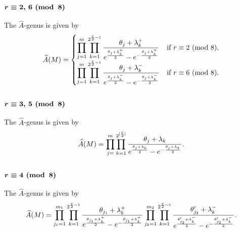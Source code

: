 \documentclass[pdftex]{sigma}
\newcommand{\A}{\mbox{$\widehat A$}}
\numberwithin{equation}{section}
\begin{document}
\subsubsection[$r\equiv 2,\,6 \,\,{\rm (mod\,\,\,8)}$]{$\boldsymbol{r\equiv 2,\,6 \,\,{\rm (mod\,\,\,8)}}$}

The \A-genus is given by
\begin{gather*}
\A(M)
= \begin{cases}
\displaystyle \prod _{j=1}^{m}\prod_{k=1}^{2^{{r\over 2}-1}}{\theta_j + \lambda_k^+\over e^{\theta_j + \lambda_k^+\over 2}
-e^{-{\theta_j + \lambda_k^+\over 2}}} & \mbox{if $r\equiv 2$ (mod 8)},\\
\displaystyle \prod_{j=1}^{m}\prod_{k=1}^{2^{{r\over 2}-1}}{\theta_j + \lambda_k^-\over e^{\theta_j + \lambda_k^-\over 2}
-e^{-{\theta_j + \lambda_k^-\over 2}}} & \mbox{if $r\equiv 6$ (mod 8)}.
\end{cases}
\end{gather*}

\subsubsection[$r\equiv3,\,5 \,\,{\rm (mod\,\,\,8)}$]{$\boldsymbol{r\equiv3,\,5 \,\,{\rm (mod\,\,\,8)}}$}

The \A-genus is given by
\begin{gather*}
\A(M) =\prod_{j=}^{m}\prod_{k=1}^{2^{[{r\over 2}]}}{\theta_j + \lambda_k\over e^{\theta_j + \lambda_k\over 2}
-e^{-{\theta_j + \lambda_k\over 2}}}.
\end{gather*}

\subsubsection[$r\equiv 4 \,\,{\rm (mod\,\,\,8)}$]{$\boldsymbol{r\equiv 4 \,\,{\rm (mod\,\,\,8)}}$}

The \A-genus is given by
\begin{gather*}
\A(M)=\prod_{j_1=1}^{m_1}\prod_{k=1}^{2^{{r\over 2}-1}}{\theta_{j_1} + \lambda_k^+\over e^{\theta_{j_1} + \lambda_k^+\over 2}
-e^{-{\theta_{j_1} + \lambda_k^+\over 2}}}
\prod_{j_2=1}^{m_2}\prod_{k=1}^{2^{{r\over 2}-1}}{\theta_{j_2}' + \lambda_{k}^-\over e^{\theta_{j_2}'
+ \lambda_{k}^-\over 2}-e^{-{\theta_{j_2}' + \lambda_{k}^-\over 2}}}.
\end{gather*}
\end{document}
